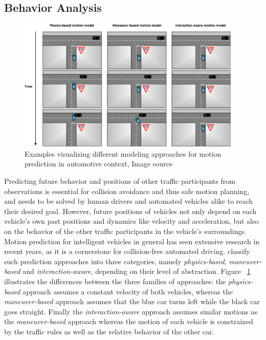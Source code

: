 \subsection{Behavior Analysis}
\label{subsec:behav_analysis}

\begin{figure}[t!]
	\centering
	\includegraphics[width=0.95\textwidth]{imgs/examples_motion_prediction_models.jpg}
	\caption{Examples visualizing different modeling approaches for motion prediction in automotive context, Image source \cite{Lefevre2014}}
	\label{fig:examples_motion_prediction_types}
\end{figure}
Predicting future behavior and positions of other traffic participants from observations is essential for collision avoidance and thus safe motion planning, and needs to be solved by human drivers and automated vehicles alike to reach their desired goal.
However, future positions of vehicles not only depend on each vehicle's own past positions and dynamics like  velocity and acceleration, but also on the behavior of the other traffic participants in the vehicle's surroundings.
Motion prediction for intelligent vehicles in general has seen extensive research in recent years, as it is a cornerstone for collision-free automated driving. \cite{Lefevre2014} classify such prediction approaches into three categories, namely \emph{physics-based}, \emph{maneuver-based} and \emph{interaction-aware}, depending on their level of abstraction.
Figure ~\ref{fig:examples_motion_prediction_types} illustrates the differences between the three families of approaches: the \emph{physics-based} approach assumes a constant velocity of both vehicles, whereas the \emph{maneuver-based} approach assumes that the blue car turns left while the black car goes straight.
Finally the \emph{interaction-aware} approach assumes similar motions as the \emph{maneuver-based} approach whereas the motion of each vehicle is constrained by the traffic rules as well as the relative behavior of the other car.

